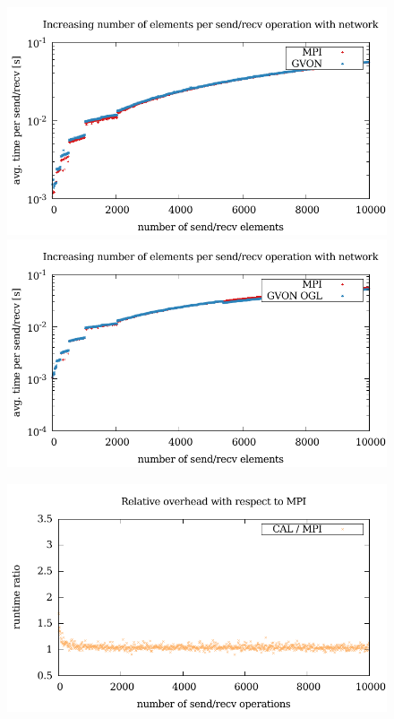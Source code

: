 \begin{figure}[H]
\begin{minipage}[t]{0.5\textwidth}
    \includegraphics[width=\textwidth]{plots/50_nsize_network_gvon_laser}
    \includegraphics[width=\textwidth]{plots/50_nsize_one_lookup_network_gvon_laser}
  \end{minipage}%
  \begin{minipage}[t]{0.5\textwidth}
    \includegraphics[width=\textwidth]{plots/50_nsend_network_overhead_cal_laser}

\end{minipage}
\end{figure}
